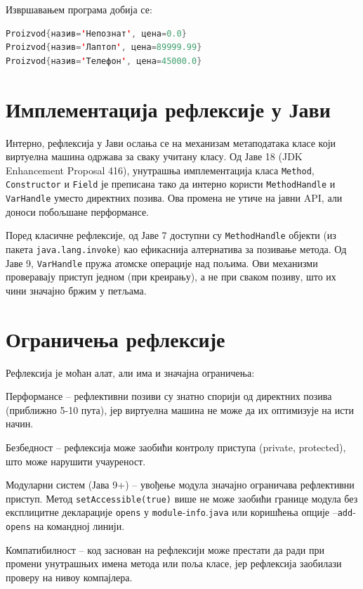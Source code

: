 Извршавањем програма добија се:

\begin{lstlisting}[language=Java]
Proizvod{назив='Непознат', цена=0.0}
Proizvod{назив='Лаптоп', цена=89999.99}
Proizvod{назив='Телефон', цена=45000.0}
\end{lstlisting}

\section{Имплементација рефлексије у Јави}

Интерно, рефлексија у Јави ослања се на механизам метаподатака класе који виртуелна машина одржава за сваку учитану класу. Од Јаве 18 (JDK Enhancement Proposal 416), унутрашња имплементација класа \texttt{Method}, \texttt{Constructor} и \texttt{Field} је преписана тако да интерно користи \texttt{MethodHandle} и \texttt{VarHandle} уместо директних позива. Ова промена не утиче на јавни API, али доноси побољшане перформансе.

Поред класичне рефлексије, од Јаве 7 доступни су \texttt{MethodHandle} објекти (из пакета \texttt{java.lang.invoke}) као ефикаснија алтернатива за позивање метода. Од Јаве 9, \texttt{VarHandle} пружа атомске операције над пољима. Ови механизми проверавају приступ једном (при креирању), а не при сваком позиву, што их чини значајно бржим у петљама.

\section{Ограничења рефлексије}

Рефлексија је моћан алат, али има и значајна ограничења:

Перформансе – рефлективни позиви су знатно спорији од директних позива (приближно 5-10 пута), јер виртуелна машина не може да их оптимизује на исти начин.

Безбедност – рефлексија може заобићи контролу приступа (private, protected), што може нарушити учауреност.

Модуларни систем (Јава 9+) – увођење модула значајно ограничава рефлективни приступ. Метод \texttt{setAccessible(true)} више не може заобићи границе модула без експлицитне декларације \texttt{opens} у \texttt{module}-\texttt{info}.\texttt{java} или коришћења опције --\texttt{add}-\texttt{opens} на командној линији.

Компатибилност – код заснован на рефлексији може престати да ради при промени унутрашњих имена метода или поља класе, јер рефлексија заобилази проверу на нивоу компајлера.

